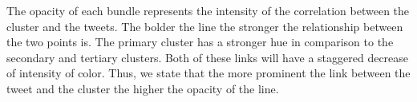 The opacity of each bundle represents the intensity of the correlation between the cluster and the tweets. The bolder the line the stronger the relationship between the two points is. The primary cluster has a stronger hue in comparison to the secondary and tertiary clusters. Both of these links will have a staggered decrease of intensity of color. Thus, we state that the more prominent the link between the tweet and the cluster the higher the opacity of the line. 